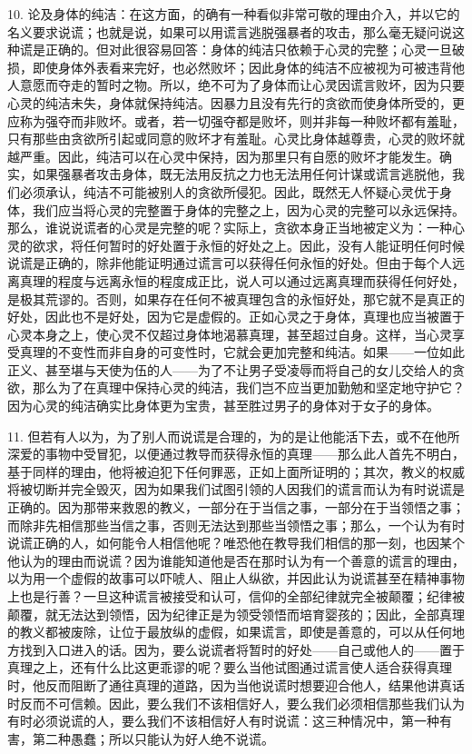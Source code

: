 10. 论及身体的纯洁：在这方面，的确有一种看似非常可敬的理由介入，并以它的名义要求说谎；也就是说，如果可以用谎言逃脱强暴者的攻击，那么毫无疑问说这种谎是正确的。但对此很容易回答：身体的纯洁只依赖于心灵的完整；心灵一旦破损，即使身体外表看来完好，也必然败坏；因此身体的纯洁不应被视为可被违背他人意愿而夺走的暂时之物。所以，绝不可为了身体而让心灵因谎言败坏，因为只要心灵的纯洁未失，身体就保持纯洁。因暴力且没有先行的贪欲而使身体所受的，更应称为强夺而非败坏。或者，若一切强夺都是败坏，则并非每一种败坏都有羞耻，只有那些由贪欲所引起或同意的败坏才有羞耻。心灵比身体越尊贵，心灵的败坏就越严重。因此，纯洁可以在心灵中保持，因为那里只有自愿的败坏才能发生。确实，如果强暴者攻击身体，既无法用反抗之力也无法用任何计谋或谎言逃脱他，我们必须承认，纯洁不可能被别人的贪欲所侵犯。因此，既然无人怀疑心灵优于身体，我们应当将心灵的完整置于身体的完整之上，因为心灵的完整可以永远保持。那么，谁说说谎者的心灵是完整的呢？实际上，贪欲本身正当地被定义为：一种心灵的欲求，将任何暂时的好处置于永恒的好处之上。因此，没有人能证明任何时候说谎是正确的，除非他能证明通过谎言可以获得任何永恒的好处。但由于每个人远离真理的程度与远离永恒的程度成正比，说人可以通过远离真理而获得任何好处，是极其荒谬的。否则，如果存在任何不被真理包含的永恒好处，那它就不是真正的好处，因此也不是好处，因为它是虚假的。正如心灵之于身体，真理也应当被置于心灵本身之上，使心灵不仅超过身体地渴慕真理，甚至超过自身。这样，当心灵享受真理的不变性而非自身的可变性时，它就会更加完整和纯洁。如果——一位如此正义、甚至堪与天使为伍的人——为了不让男子受凌辱而将自己的女儿交给人的贪欲，那么为了在真理中保持心灵的纯洁，我们岂不应当更加勤勉和坚定地守护它？因为心灵的纯洁确实比身体更为宝贵，甚至胜过男子的身体对于女子的身体。\par

11. 但若有人以为，为了别人而说谎是合理的，为的是让他能活下去，或不在他所深爱的事物中受冒犯，以便通过教导而获得永恒的真理——那么此人首先不明白，基于同样的理由，他将被迫犯下任何罪恶，正如上面所证明的；其次，教义的权威将被切断并完全毁灭，因为如果我们试图引领的人因我们的谎言而认为有时说谎是正确的。因为那带来救恩的教义，一部分在于当信之事，一部分在于当领悟之事；而除非先相信那些当信之事，否则无法达到那些当领悟之事；那么，一个认为有时说谎正确的人，如何能令人相信他呢？唯恐他在教导我们相信的那一刻，也因某个他认为的理由而说谎？因为谁能知道他是否在那时认为有一个善意的谎言的理由，以为用一个虚假的故事可以吓唬人、阻止人纵欲，并因此认为说谎甚至在精神事物上也是行善？一旦这种谎言被接受和认可，信仰的全部纪律就完全被颠覆；纪律被颠覆，就无法达到领悟，因为纪律正是为领受领悟而培育婴孩的；因此，全部真理的教义都被废除，让位于最放纵的虚假，如果谎言，即使是善意的，可以从任何地方找到入口进入的话。因为，要么说谎者将暂时的好处——自己或他人的——置于真理之上，还有什么比这更乖谬的呢？要么当他试图通过谎言使人适合获得真理时，他反而阻断了通往真理的道路，因为当他说谎时想要迎合他人，结果他讲真话时反而不可信赖。因此，要么我们不该相信好人，要么我们必须相信那些我们认为有时必须说谎的人，要么我们不该相信好人有时说谎：这三种情况中，第一种有害，第二种愚蠢；所以只能认为好人绝不说谎。\par

